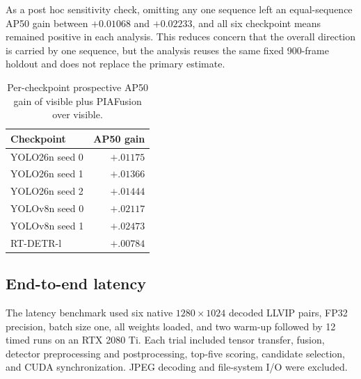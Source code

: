\documentclass[11pt]{article}
\begin{document}
As a post hoc sensitivity check, omitting any one sequence left an
equal-sequence AP50 gain between \(+0.01068\) and \(+0.02233\), and all six
checkpoint means remained positive in each analysis. This reduces concern that
the overall direction is carried by one sequence, but the analysis reuses the
same fixed 900-frame holdout and does not replace the primary estimate.

\begin{table}[ht]
\centering
\small
\caption{Per-checkpoint prospective AP50 gain of visible plus PIAFusion over
visible.}
\label{tab:pia-prospective-checkpoints}
\begin{tabular}{@{}lr@{}}
\toprule
Checkpoint & AP50 gain \\
\midrule
YOLO26n seed 0 & \(+.01175\) \\
YOLO26n seed 1 & \(+.01366\) \\
YOLO26n seed 2 & \(+.01444\) \\
YOLOv8n seed 0 & \(+.02117\) \\
YOLOv8n seed 1 & \(+.02473\) \\
RT-DETR-l & \(+.00784\) \\
\bottomrule
\end{tabular}
\end{table}

\subsection{End-to-end latency}

The latency benchmark used six native \(1280\times1024\) decoded LLVIP pairs,
FP32 precision, batch size one, all weights loaded, and two warm-up followed
by 12 timed runs on an RTX 2080 Ti. Each trial included tensor transfer,
fusion, detector preprocessing and postprocessing, top-five scoring, candidate
selection, and CUDA synchronization. JPEG decoding and file-system I/O were
excluded.
\end{document}
